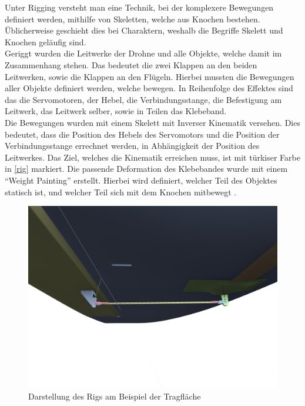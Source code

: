 Unter Rigging versteht man eine Technik, bei der komplexere Bewegungen definiert werden, mithilfe von Skeletten, welche aus Knochen bestehen. Üblicherweise geschieht dies bei Charaktern, weshalb die Begriffe Skelett und Knochen geläufig sind. \\
Geriggt wurden die Leitwerke der Drohne und alle Objekte, welche damit im Zusammenhang stehen. Das bedeutet die zwei Klappen an den beiden Leitwerken, sowie die Klappen an den Flügeln. Hierbei mussten die Bewegungen aller Objekte definiert werden, welche bewegen. In Reihenfolge des Effektes sind das die Servomotoren, der Hebel, die Verbindungsstange, die Befestigung am Leitwerk, das Leitwerk selber, sowie in Teilen das Klebeband.\\
Die Bewegungen wurden mit einem Skelett mit Inverser Kinematik versehen. Dies bedeutet, dass die Position des Hebels des Servomotors und die Position der Verbindungsstange errechnet werden, in Abhängigkeit der Position des Leitwerkes. Das Ziel, welches die Kinematik erreichen muss, ist mit türkiser Farbe in \autoref{rig} markiert. Die passende Deformation des Klebebandes wurde mit einem ``Weight Painting'' erstellt. Hierbei wird definiert, welcher Teil des Objektes statisch ist, und welcher Teil sich mit dem Knochen mitbewegt .

\begin{figure}[H]
\begin{center}
\includegraphics[width=\textwidth]{gfx/prod/plane/plane7.jpg}
\caption{Darstellung des Rigs am Beispiel der Tragfläche}
\label{rig}
\end{center}
\end{figure}

